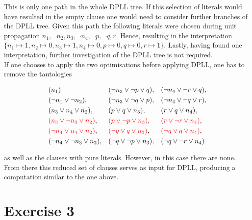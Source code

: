 \documentclass[11pt,a4paper]{article}
\begin{document}
\begin{enumerate}
\end{enumerate}

This is only one path in the whole DPLL tree. If this selection of literals would have resulted in the empty clause one would need to consider further branches of the DPLL tree. Given this path the following literals were chosen during unit propagation $n_1, \neg n_2, n_3, \neg n_4, \neg p, \neg q, r$. Hence, resulting in the interpretation $\{n_1 \mapsto 1, n_2 \mapsto 0, n_3 \mapsto 1, n_4 \mapsto 0, p \mapsto 0, q \mapsto 0, r\mapsto 1\}$. Lastly, having found one interpretation, further investigation of the DPLL tree is not required.\\



If one chooses to apply the two optimisations before applying DPLL, one has to remove the tautologies

\begin{align*}
& (n_1)& & (\neg n_3 \lor \neg p \lor q), & & (\neg n_4 \lor \neg r \lor q),\\ 
&(\neg n_1 \lor \neg n_2),  & & (\neg n_3 \lor \neg q \lor p),  && (\neg n_4 \lor \neg q \lor r), \\
&(n_3 \lor n_4 \lor n_2), & & (p\lor q \lor n_3),  && (r \lor q \lor n_4), \\
&\textcolor{red}{(n_3 \lor \neg  n_3 \lor n_2)} , & & \textcolor{red}{(p \lor \neg p \lor n_3)}, & & \textcolor{red}{(r \lor \neg r \lor n_4)}, \\
& \textcolor{red}{(\neg n_4 \lor  n_4 \lor n_2)} , & & \textcolor{red}{(\neg q \lor q \lor n_3)},& & \textcolor{red}{(\neg q \lor q \lor n_4)}, \\
&(\neg n_4 \lor  \neg  n_3 \lor n_2), && (\neg q \lor \neg p \lor n_3), & & (\neg q \lor \neg r \lor n_4)
\end{align*}

as well as the clauses with pure literals. However, in this case there are none. From there this reduced set of clauses serves as input for DPLL, producing a computation similar to the one above.


\section*{Exercise 3}
\end{document}
